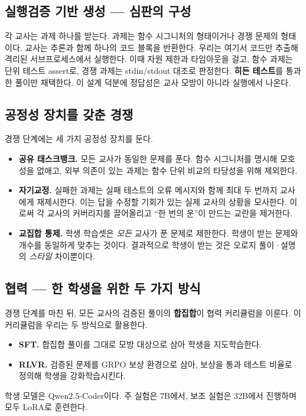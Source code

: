 \documentclass[11pt]{article}
\begin{document}
\subsection{실행검증 기반 생성 --- 심판의 구성}
각 교사는 과제 하나를 받는다. 과제는 함수 시그니처의 형태이거나 경쟁 문제의 형태이다. 교사는 추론과 함께 하나의 코드 블록을 반환한다. 우리는 여기서 코드만 추출해 격리된 서브프로세스에서 실행한다. 이때 자원 제한과 타임아웃을 걸고, 함수 과제는 단위 테스트 assert로, 경쟁 과제는 stdin/stdout 대조로 판정한다. \textbf{히든 테스트}를 통과한 풀이만 채택한다. 이 설계 덕분에 정답성은 교사 모방이 아니라 실행에서 나온다.

\subsection{공정성 장치를 갖춘 경쟁}
경쟁 단계에는 세 가지 공정성 장치를 둔다.
\begin{itemize}
  \item \textbf{공유 태스크뱅크.} 모든 교사가 동일한 문제를 푼다. 함수 시그니처를 명시해 모호성을 없애고, 외부 의존이 있는 과제는 함수 단위 비교의 타당성을 위해 제외한다.
  \item \textbf{자기교정.} 실패한 과제는 실패 테스트의 오류 메시지와 함께 최대 두 번까지 교사에게 재제시한다. 이는 답을 수정할 기회가 있는 실제 교사의 상황을 모사한다. 이로써 각 교사의 커버리지를 끌어올리고 ``한 번의 운''이 만드는 교란을 제거한다.
  \item \textbf{교집합 통제.} 학생 학습셋은 \emph{모든} 교사가 푼 문제로 제한한다. 학생이 받는 문제와 개수를 동일하게 맞추는 것이다. 결과적으로 학생이 받는 것은 오로지 풀이·설명의 \emph{스타일} 차이뿐이다.
\end{itemize}

\subsection{협력 --- 한 학생을 위한 두 가지 방식}
경쟁 단계를 마친 뒤, 모든 교사의 검증된 풀이의 \textbf{합집합}이 협력 커리큘럼을 이룬다. 이 커리큘럼을 우리는 두 방식으로 활용한다.
\begin{itemize}
  \item \textbf{SFT.} 합집합 풀이를 그대로 모방 대상으로 삼아 학생을 지도학습한다.
  \item \textbf{RLVR.} 검증된 문제를 GRPO 보상 환경으로 삼아, 보상을 통과 테스트 비율로 정의해 학생을 강화학습시킨다.
\end{itemize}
학생 모델은 Qwen2.5-Coder이다. 주 실험은 7B에서, 보조 실험은 32B에서 진행하며 모두 LoRA로 훈련한다.
\end{document}
